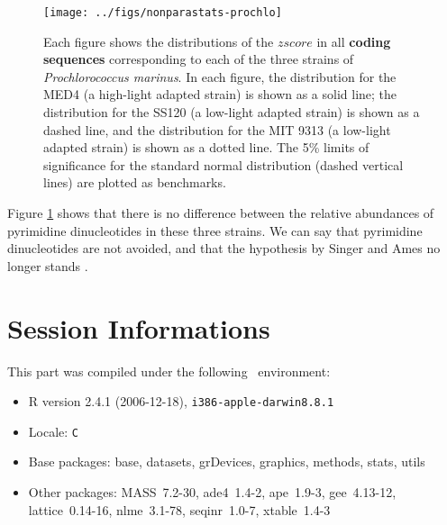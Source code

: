 \documentclass{article}
\begin{document}
\begin{figure}[H]
   \begin{center}
\texttt{[image: ../figs/nonparastats-prochlo]}
\end{center}
   \caption{Each figure shows the distributions of the $zscore$ in all
     \textbf{coding sequences} corresponding to each of the three
     strains of \textit{Prochlorococcus marinus}. In each figure, the
     distribution for the MED4 (a high-light adapted strain) is shown
     as a solid line; the distribution for the SS120 (a low-light
     adapted strain) is shown as a dashed line, and the distribution
     for the MIT 9313 (a low-light adapted strain) is shown as a
     dotted line. The 5\% limits of significance for the standard
     normal distribution (dashed vertical lines) are plotted as
     benchmarks.}
\label{prochlo}
\end{figure}

Figure \ref{prochlo} shows that there is no difference between the
relative abundances of pyrimidine dinucleotides in these three
strains. We can say that pyrimidine dinucleotides are not avoided, and
that the hypothesis by Singer and Ames \cite{Singer} no longer stands
\cite{UV}.


\section{Session Informations}

This part was compiled under the following \Rlogo{}~environment:

\begin{itemize}
  \item R version 2.4.1 (2006-12-18), \verb|i386-apple-darwin8.8.1|
  \item Locale: \verb|C|
  \item Base packages: base, datasets, grDevices, graphics, methods,
    stats, utils
  \item Other packages: MASS~7.2-30, ade4~1.4-2, ape~1.9-3,
    gee~4.13-12, lattice~0.14-16, nlme~3.1-78, seqinr~1.0-7,
    xtable~1.4-3
\end{itemize}



\clearpage
{}


\end{document}
